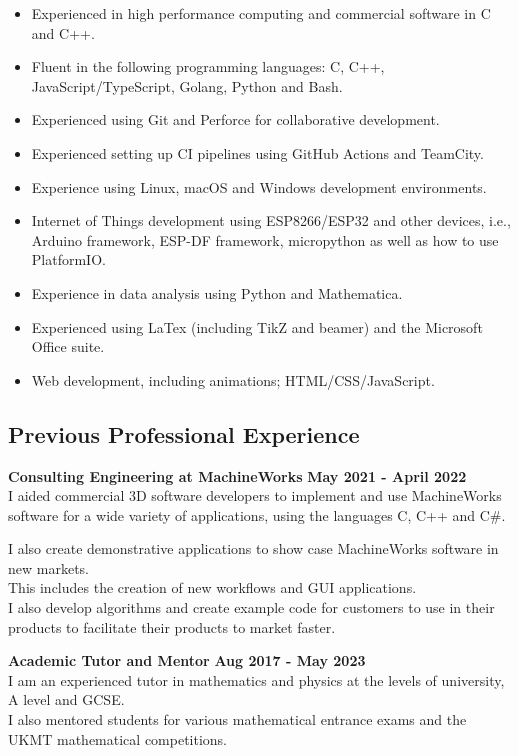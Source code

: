 \documentclass[10pt]{article}
\providecommand{\tightlist}{%
  \setlength{\itemsep}{0pt}\setlength{\parskip}{0pt}}
\begin{document}
\begin{itemize}
\tightlist
\item
  Experienced in high performance computing and commercial software in C
  and C++.
\item
  Fluent in the following programming languages: C, C++,
  JavaScript/TypeScript, Golang, Python and Bash.
\item
  Experienced using Git and Perforce for collaborative development.
\item
  Experienced setting up CI pipelines using GitHub Actions and TeamCity.
\item
  Experience using Linux, macOS and Windows development environments.
\item
  Internet of Things development using ESP8266/ESP32 and other devices,
  i.e., Arduino framework, ESP-DF framework, micropython as well as how
  to use PlatformIO.
\item
  Experience in data analysis using Python and Mathematica.
\item
  Experienced using LaTex (including TikZ and beamer) and the Microsoft
  Office suite.
\item
  Web development, including animations; HTML/CSS/JavaScript.
\end{itemize}

\subsection{Previous Professional
Experience}\label{previous-professional-experience}

\textbf{Consulting Engineering at MachineWorks}
\hfill \textbf{May 2021 - April 2022} \\
I aided commercial 3D software developers to implement and use
MachineWorks software for a wide variety of applications, using the
languages C, C++ and C\#.

I also create demonstrative applications to show case MachineWorks
software in new markets.\\
This includes the creation of new workflows and GUI applications.\\
I also develop algorithms and create example code for customers to use
in their products to facilitate their products to market faster.

\textbf{Academic Tutor and Mentor} \hfill \textbf{Aug 2017 - May 2023 }
\\
I am an experienced tutor in mathematics and physics at the levels of
university, A level and GCSE. \\
I also mentored students for various mathematical entrance exams and the
UKMT mathematical competitions.
\end{document}
